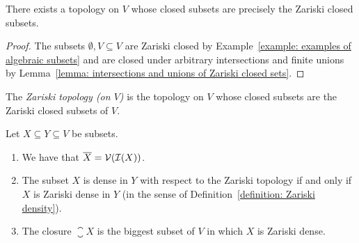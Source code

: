 \begin{corollary}
  There exists a topology on $V$ whose closed subsets are precisely the Zariski closed subsets.
\end{corollary}


\begin{proof}
  The subsets $\emptyset, V \subseteq V$ are Zariski closed by Example~\ref{example: examples of algebraic subsets} and are closed under arbitrary intersections and finite unions by Lemma~\ref{lemma: intersections and unions of Zariski closed sets}.
\end{proof}


\begin{definition}
  The \emph{Zariski topology \textup(on $V$\textup)} is the topology on $V$ whose closed subsets are the Zariski closed subsets of $V$.
\end{definition}


\begin{proposition}
  \label{proposition: characterization of Zariski closed and Zariski dense}
  Let $X \subseteq Y \subseteq V$ be subsets.
  \begin{enumerate}
    \item
      We have that $\overline{X} = \mathcal{V}(\mathcal{I}(X))$.
    \item
      \label{enumerate: Zariski density is Zariski density}
      The subset $X$ is dense in $Y$ with respect to the Zariski topology if and only if $X$ is Zariski dense in $Y$ (in the sense of Definition~\ref{definition: Zariski density}).
    \item
      The closure $\closure{X}$ is the biggest subset of $V$ in which $X$ is Zariski dense.
  \end{enumerate}
\end{proposition}


